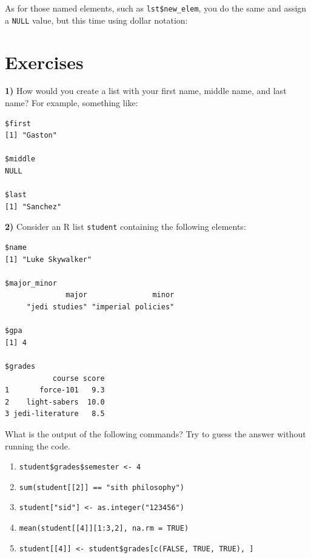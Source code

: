 \documentclass[
]{book}
\newenvironment{Shaded}{\begin{snugshade}}{\end{snugshade}}
\newcommand{\CommentTok}[1]{\textcolor[rgb]{0.56,0.35,0.01}{\textit{#1}}}
\newcommand{\ConstantTok}[1]{\textcolor[rgb]{0.00,0.00,0.00}{#1}}
\newcommand{\NormalTok}[1]{#1}
\newcommand{\OtherTok}[1]{\textcolor[rgb]{0.56,0.35,0.01}{#1}}
\newcommand{\SpecialCharTok}[1]{\textcolor[rgb]{0.00,0.00,0.00}{#1}}
\begin{document}
As for those named elements, such as \texttt{lst\$new\_elem}, you do the same and assign
a \texttt{NULL} value, but this time using dollar notation:

\begin{Shaded}
\end{Shaded}

\hypertarget{exercises-2}{%
\section{Exercises}\label{exercises-2}}

\textbf{1)} How would you create a list with your first name, middle name, and last
name? For example, something like:

\begin{verbatim}
$first
[1] "Gaston"

$middle
NULL

$last
[1] "Sanchez"
\end{verbatim}

\textbf{2)} Consider an R list \texttt{student} containing the following elements:

\begin{verbatim}
$name
[1] "Luke Skywalker"

$major_minor
              major               minor 
     "jedi studies" "imperial policies" 

$gpa
[1] 4

$grades
           course score
1       force-101   9.3
2    light-sabers  10.0
3 jedi-literature   8.5
\end{verbatim}

What is the output of the following commands? Try to guess the answer without
running the code.

\begin{enumerate}
\def\labelenumi{\alph{enumi})}
\item
  \texttt{student\$grades\$semester\ \textless{}-\ 4}
\item
  \texttt{sum(student{[}{[}2{]}{]}\ ==\ "sith\ philosophy")}
\item
  \texttt{student{[}"sid"{]}\ \textless{}-\ as.integer("123456")}
\item
  \texttt{mean(student{[}{[}4{]}{]}{[}1:3,2{]},\ na.rm\ =\ TRUE)}
\item
  \texttt{student{[}{[}4{]}{]}\ \textless{}-\ student\$grades{[}c(FALSE,\ TRUE,\ TRUE),\ {]}}
\end{enumerate}
\end{document}

